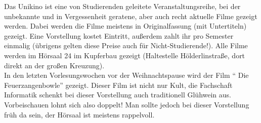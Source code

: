 Das Unikino ist eine von Studierenden geleitete Veranstaltungsreihe, bei der unbekannte und in Vergessenheit geratene, aber auch recht aktuelle Filme gezeigt werden. Dabei werden die Filme meistens in Originalfassung (mit Untertiteln) gezeigt. Eine Vorstellung kostet  Eintritt, außerdem zahlt ihr pro Semester einmalig  (übrigens gelten diese Preise auch für Nicht-Studierende!). Alle Filme werden im Hörsaal 24 im Kupferbau gezeigt (Haltestelle Hölderlinstraße, dort direkt an der großen Kreuzung).\\
In den letzten Vorlesungswochen vor der Weihnachtspause wird der Film "` Die Feu\-er\-zang\-en\-bow\-le"' gezeigt. Dieser Film ist nicht nur Kult, die Fachschaft Informatik schenkt bei dieser Vorstellung auch traditionell Glühwein aus. Vorbeischauen lohnt sich also doppelt! Man sollte jedoch bei dieser Vorstellung früh da sein, der Hörsaal ist meistens rappelvoll.


